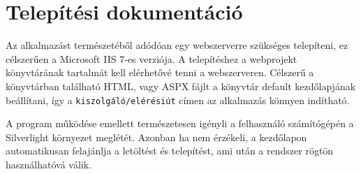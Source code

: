 \chapter{Telepítési dokumentáció}\label{sect:telepites}

Az alkalmazást természetéből adódóan egy webszerverre szükséges telepíteni, ez célszerűen a Microsoft IIS 7-es verziója. A telepítéshez a webprojekt könyvtárának tartalmát kell elérhetővé tenni a webszerveren. Célszerű a könyvtárban található HTML, vagy ASPX fájlt a könyvtár default kezdőlapjának beállítani, így a \texttt{kiszolgáló/elérésiút} címen az alkalmazás könnyen indítható.

A program működése emellett természetesen igényli a felhasználó számítógépén a Silverlight környezet meglétét. Azonban ha nem érzékeli, a kezdőlapon automatikusan felajánlja a letöltést és telepítést, ami után a rendszer rögtön használhatóvá válik.
